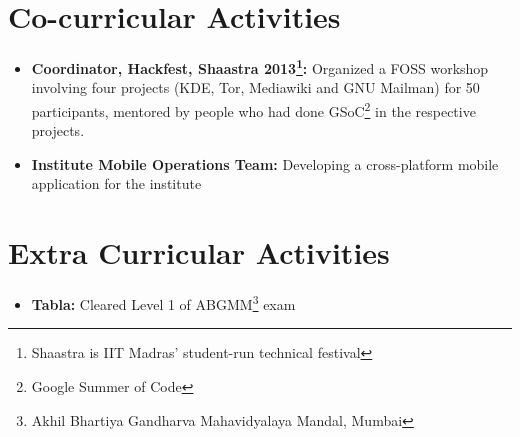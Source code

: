 \documentclass[letterpaper,11pt]{resume}
\begin{document}

\section{Co-curricular Activities}
\begin{itemize}
  \item {\bf Coordinator, Hackfest, Shaastra 2013\footnote{Shaastra is IIT Madras' student-run technical festival}: } Organized a FOSS workshop involving four projects (KDE, Tor, Mediawiki and GNU Mailman) for 50 participants, mentored by people who had done GSoC\footnote{Google Summer of Code} in the respective projects.
  \end{itemize} 
   \begin{itemize}
  \item {\bf Institute Mobile Operations Team:} Developing a cross-platform mobile application for the institute
  \end{itemize} 
\section{Extra Curricular Activities}
\begin{itemize}
 \item {\bf Tabla:} Cleared Level 1 of ABGMM\footnote{Akhil Bhartiya Gandharva Mahavidyalaya Mandal, Mumbai} exam
\end{itemize}
\end{document}
